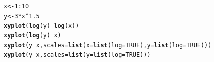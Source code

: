 \documentclass[twoside]{book}\usepackage[]{graphicx}\usepackage[]{xcolor}
\makeatletter
\newcommand{\hlnum}[1]{\textcolor[rgb]{0.686,0.059,0.569}{#1}}%
\newcommand{\hlopt}[1]{\textcolor[rgb]{0,0,0}{#1}}%
\newcommand{\hlstd}[1]{\textcolor[rgb]{0.345,0.345,0.345}{#1}}%
\newcommand{\hlkwb}[1]{\textcolor[rgb]{0.69,0.353,0.396}{#1}}%
\newcommand{\hlkwc}[1]{\textcolor[rgb]{0.333,0.667,0.333}{#1}}%
\newcommand{\hlkwd}[1]{\textcolor[rgb]{0.737,0.353,0.396}{\textbf{#1}}}%
\newenvironment{kframe}{%
 \def\at@end@of@kframe{}%
 \ifinner\ifhmode%
  \def\at@end@of@kframe{\end{minipage}}%
  \begin{minipage}{\columnwidth}%
 \fi\fi%
 \def\FrameCommand##1{\hskip\@totalleftmargin \hskip-\fboxsep
 \colorbox{shadecolor}{##1}\hskip-\fboxsep
     \hskip-\linewidth \hskip-\@totalleftmargin \hskip\columnwidth}%
 \MakeFramed {\advance\hsize-\width
   \@totalleftmargin\z@ \linewidth\hsize
   \@setminipage}}%
 {\par\unskip\endMakeFramed%
 \at@end@of@kframe}
\newenvironment{knitrout}{}{} %
\makeatother
\begin{document}
\begin{knitrout}
\color{fgcolor}\begin{kframe}
\begin{alltt}
\hlstd{x} \hlkwb{<-} \hlnum{1}\hlopt{:}\hlnum{10}
\hlstd{y} \hlkwb{<-} \hlnum{3} \hlopt{*} \hlstd{x}\hlopt{^}\hlnum{1.5}
\hlkwd{xyplot}\hlstd{(}\hlkwd{log}\hlstd{(y)} \hlopt{~} \hlkwd{log}\hlstd{(x))}
\hlkwd{xyplot}\hlstd{(}\hlkwd{log}\hlstd{(y)} \hlopt{~} \hlstd{x)}
\hlkwd{xyplot}\hlstd{(y} \hlopt{~} \hlstd{x,} \hlkwc{scales} \hlstd{=} \hlkwd{list}\hlstd{(}\hlkwc{x} \hlstd{=} \hlkwd{list}\hlstd{(}\hlkwc{log} \hlstd{=} \hlnum{TRUE}\hlstd{),} \hlkwc{y} \hlstd{=} \hlkwd{list}\hlstd{(}\hlkwc{log} \hlstd{=} \hlnum{TRUE}\hlstd{)))}
\hlkwd{xyplot}\hlstd{(y} \hlopt{~} \hlstd{x,} \hlkwc{scales} \hlstd{=} \hlkwd{list}\hlstd{(}\hlkwc{y} \hlstd{=} \hlkwd{list}\hlstd{(}\hlkwc{log} \hlstd{=} \hlnum{TRUE}\hlstd{)))}
\end{alltt}
\end{kframe}


\end{knitrout}
\end{document}

